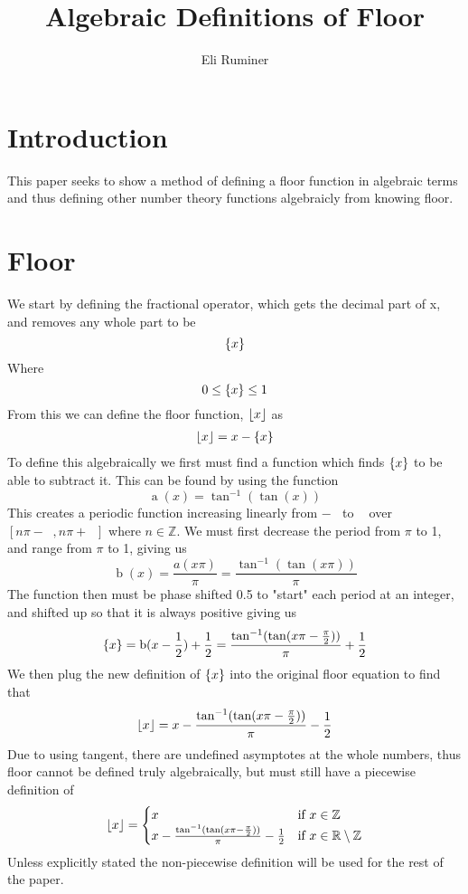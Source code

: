 \documentclass[11pt]{article}
\title{Algebraic Definitions of Floor}
\author{Eli Ruminer}
\date{}
\DeclarePairedDelimiter\floor{\lfloor}{\rfloor}
\DeclarePairedDelimiter\fractional{\{}{\}}
\DeclareMathOperator{\hp}{\frac{\pi}{2}}
\begin{document}
\begin{titlepage}
\clearpage\maketitle
\thispagestyle{empty}
\end{titlepage}

\tableofcontents
\newpage

\section{Introduction}
This paper seeks to show a method of defining a floor function in algebraic terms and thus defining other number theory functions algebraicly from knowing floor.

\section{Floor}
We start by defining the fractional operator, which gets the decimal part of x, and removes any whole part to be \[\fractional*{x}\]
Where\[0\leq\fractional*{x}\leq1\]
From this we can define the floor function, \(\floor*{x}\) as
\begin{gather*}
\floor*{x}=x-\fractional*{x}
\end{gather*}
To define this algebraically we first must find a function which finds \(\fractional*{x}\) to be able to subtract it. This can be found by using the function
\[\operatorname{a}(x)=\tan^{\mathrm{-1}}(\tan(x))\]
This creates a periodic function increasing linearly from \(-\hp\) to \(\hp\) over \([n\pi-\hp,n\pi+\hp]\) where \(n\in\mathbb{Z}\). We must first decrease the period from \(\pi\) to 1, and range from \(\pi\) to 1, giving us
\[\operatorname{b}(x)=\frac{a(x\pi)}{\pi}=\frac{\tan^{\mathrm{-1}}(\tan(x\pi))}{\pi}\]
The function then must be phase shifted 0.5 to "start" each period at an integer, and shifted up so that it is always positive giving us
\[\fractional*{x}=\operatorname{b}(x-\frac{1}{2}) + \frac{1}{2}=\frac{\tan^{\mathrm{-1}}(\tan(x\pi-\frac{\pi}{2}))}{\pi}+\frac{1}{2}\]
We then plug the new definition of \(\fractional*{x}\) into the original floor equation to find that
\[\floor*{x}=x-\frac{\tan^{\mathrm{-1}}(\tan(x\pi-\frac{\pi}{2}))}{\pi}-\frac{1}{2}\]
Due to using tangent, there are undefined asymptotes at the whole numbers, thus floor cannot be defined truly algebraically, but must still have a piecewise definition of
\begin{gather*}
\floor*{x}=\begin{cases}
x & \text{if } x \in \mathbb{Z}\\
x-\frac{\tan^{\mathrm{-1}}(\tan(x\pi-\frac{\pi}{2}))}{\pi}-\frac{1}{2} & \text{if } x \in \mathbb{R}\setminus\mathbb{Z}\\
\end{cases}
\end{gather*}
Unless explicitly stated the non-piecewise definition will be used for the rest of the paper.
\end{document}
